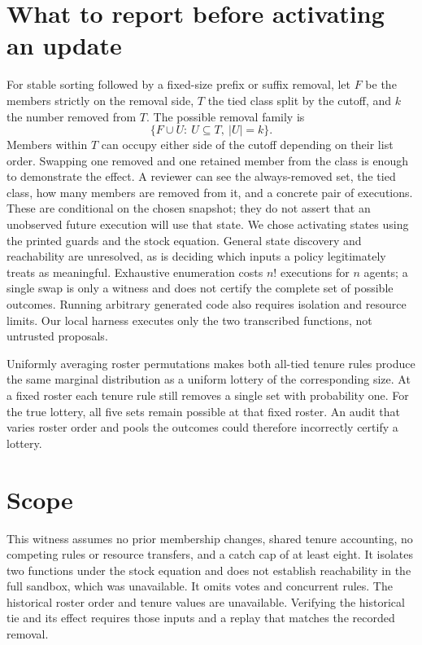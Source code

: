 \documentclass[letterpaper]{article}
\begin{document}
\section{What to report before activating an update}
For stable sorting followed by a fixed-size prefix or suffix removal, let $F$ be the members strictly on the removal side, $T$ the tied class split by the cutoff, and $k$ the number removed from $T$. The possible removal family is
\[
\{F\cup U:\ U\subseteq T,\ |U|=k\}.
\]
Members within $T$ can occupy either side of the cutoff depending on their list order. Swapping one removed and one retained member from the class is enough to demonstrate the effect. A reviewer can see the always-removed set, the tied class, how many members are removed from it, and a concrete pair of executions. These are conditional on the chosen snapshot; they do not assert that an unobserved future execution will use that state. We chose activating states using the printed guards and the stock equation. General state discovery and reachability are unresolved, as is deciding which inputs a policy legitimately treats as meaningful. Exhaustive enumeration costs $n!$ executions for $n$ agents; a single swap is only a witness and does not certify the complete set of possible outcomes. Running arbitrary generated code also requires isolation and resource limits. Our local harness executes only the two transcribed functions, not untrusted proposals.

Uniformly averaging roster permutations makes both all-tied tenure rules produce the same marginal distribution as a uniform lottery of the corresponding size. At a fixed roster each tenure rule still removes a single set with probability one. For the true lottery, all five sets remain possible at that fixed roster. An audit that varies roster order and pools the outcomes could therefore incorrectly certify a lottery.

\section{Scope}
This witness assumes no prior membership changes, shared tenure accounting, no competing rules or resource transfers, and a catch cap of at least eight. It isolates two functions under the stock equation and does not establish reachability in the full sandbox, which was unavailable. It omits votes and concurrent rules. The historical roster order and tenure values are unavailable. Verifying the historical tie and its effect requires those inputs and a replay that matches the recorded removal.
\end{document}
